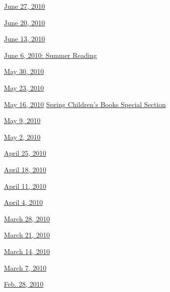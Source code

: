 \href{http://www.nytimes3xbfgragh.onion/indexes/2010/06/26/books/review/index.html}{June
27, 2010}

\href{http://www.nytimes3xbfgragh.onion/indexes/2010/06/19/books/review/index.html}{June
20, 2010}

\href{http://www.nytimes3xbfgragh.onion/indexes/2010/06/12/books/review/index.html}{June
13, 2010}

\href{http://www.nytimes3xbfgragh.onion/indexes/2010/06/05/books/review/index.html}{June
6, 2010: Summer Reading}

\href{http://www.nytimes3xbfgragh.onion/indexes/2010/05/29/books/review/index.html}{May
30, 2010}

\href{http://www.nytimes3xbfgragh.onion/indexes/2010/05/22/books/review/index.html}{May
23, 2010}

\href{http://www.nytimes3xbfgragh.onion/indexes/2010/05/15/books/review/index.html}{May
16, 2010} \textbar{}
\href{http://www.nytimes3xbfgragh.onion/indexes/2010/05/15/arts/artsspecial/index.html}{Spring
Children's Books Special Section}

\href{http://www.nytimes3xbfgragh.onion/indexes/2010/05/08/books/review/index.html}{May
9, 2010}

\href{http://www.nytimes3xbfgragh.onion/indexes/2010/05/01/books/review/index.html}{May
2, 2010}

\href{http://www.nytimes3xbfgragh.onion/indexes/2010/04/24/books/review/index.html}{April
25, 2010}

\href{http://www.nytimes3xbfgragh.onion/indexes/2010/04/17/books/review/index.html}{April
18, 2010}

\href{http://www.nytimes3xbfgragh.onion/indexes/2010/04/10/books/review/index.html}{April
11, 2010}

\href{http://www.nytimes3xbfgragh.onion/indexes/2010/04/03/books/review/index.html}{April
4, 2010}

\href{http://www.nytimes3xbfgragh.onion/indexes/2010/03/27/books/review/index.html}{March
28, 2010}

\href{http://www.nytimes3xbfgragh.onion/indexes/2010/03/20/books/review/index.html}{March
21, 2010}

\href{http://www.nytimes3xbfgragh.onion/indexes/2010/03/13/books/review/index.html}{March
14, 2010}

\href{http://www.nytimes3xbfgragh.onion/indexes/2010/03/06/books/review/index.html}{March
7, 2010}

\href{http://www.nytimes3xbfgragh.onion/indexes/2010/02/27/books/review/index.html}{Feb.
28, 2010}

